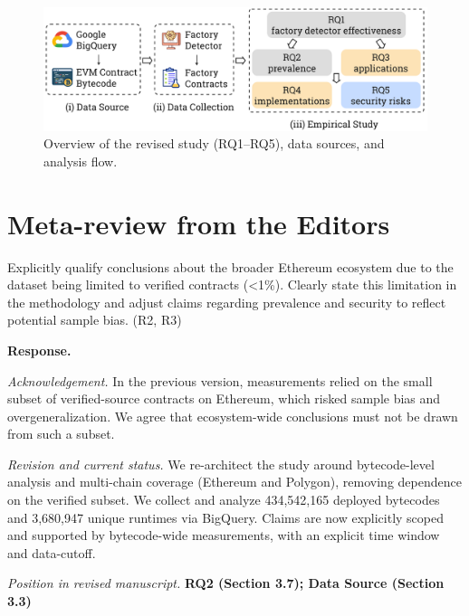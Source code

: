 \documentclass[acmsmall]{acmart}
\begin{document}
	\vspace{0.5em}
	\begin{figure}[t]
		\centering
		\includegraphics[width=0.9\linewidth]{figure/overview.pdf}
		\caption{Overview of the revised study (RQ1--RQ5), data sources, and analysis flow.}
		\label{fig:overview}
	\end{figure}

	\newpage

	\section*{Meta-review from the Editors}

	\begin{tcolorbox}
		[commentbox,title=Editor/AE -- Comment 1] Explicitly qualify conclusions about the broader
		Ethereum ecosystem due to the dataset being limited to verified contracts (<1\%). Clearly state
		this limitation in the methodology and adjust claims regarding prevalence and security to reflect
		potential sample bias. (R2, R3)
	\end{tcolorbox}

	\noindent
	\textbf{Response.}

	\textit{Acknowledgement.} In the previous version, measurements relied on the small subset of verified-source
	contracts on Ethereum, which risked sample bias and overgeneralization. We agree that ecosystem-wide
	conclusions must not be drawn from such a subset.

	\textit{Revision and current status.} We re-architect the study around bytecode-level analysis
	and multi-chain coverage (Ethereum and Polygon), removing dependence on the verified subset. We
	collect and analyze 434,542,165 deployed bytecodes and 3,680,947 unique runtimes via BigQuery. Claims
	are now explicitly scoped and supported by bytecode-wide measurements, with an explicit time
	window and data-cutoff.

	\vspace{0.25em}
	\textit{Position in revised manuscript.} {\color{red}\textbf{RQ2 (Section 3.7); Data Source (Section 3.3)}}
\end{document}
